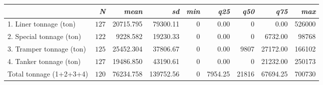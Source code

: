 \begin{tabular}{lrrrrrrrr}
\toprule
\multicolumn{1}{l}{\itshape }&\multicolumn{1}{r}{\itshape N}&\multicolumn{1}{r}{\itshape mean}&\multicolumn{1}{r}{\itshape sd}&\multicolumn{1}{r}{\itshape min}&\multicolumn{1}{r}{\itshape q25}&\multicolumn{1}{r}{\itshape q50}&\multicolumn{1}{r}{\itshape q75}&\multicolumn{1}{r}{\itshape max}\tabularnewline
\midrule
1. Liner tonnage (ton)&$127$&20715.795&79300.11&0&0.00&0&0.00&526000\tabularnewline
2. Special tonnage (ton)&$122$&9228.582&19230.33&0&0.00&0&6732.00&98768\tabularnewline
3. Tramper tonnage (ton)&$125$&25452.304&37806.67&0&0.00&9807&27172.00&166102\tabularnewline
4. Tanker tonnage (ton)&$127$&19486.850&43190.61&0&0.00&0&21232.00&250173\tabularnewline
Total tonnage (1+2+3+4)&$120$&76234.758&139752.56&0&7954.25&21816&67694.25&700730\tabularnewline
\bottomrule
\end{tabular}
